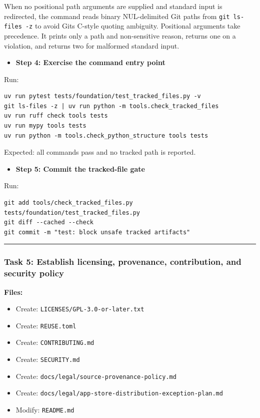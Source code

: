 \documentclass[
  letterpaper,
]{article}
\newcommand{\passthrough}[1]{#1}
\providecommand{\tightlist}{%
  \setlength{\itemsep}{0pt}\setlength{\parskip}{0pt}}
\begin{document}
When no positional path arguments are supplied and standard input is redirected, the command reads binary NUL-delimited
Git paths from \passthrough{\lstinline!git ls-files -z!} to avoid Git\textquotesingle s C-style quoting ambiguity.
Positional arguments take precedence. It prints only a path and non-sensitive reason, returns one on a violation, and
returns two for malformed standard input.

\begin{itemize}
\tightlist
\item[$\boxtimes$]
  \textbf{Step 4: Exercise the command entry point}
\end{itemize}

Run:

\begin{lstlisting}
uv run pytest tests/foundation/test_tracked_files.py -v
git ls-files -z | uv run python -m tools.check_tracked_files
uv run ruff check tools tests
uv run mypy tools tests
uv run python -m tools.check_python_structure tools tests
\end{lstlisting}

Expected: all commands pass and no tracked path is reported.

\begin{itemize}
\tightlist
\item[$\boxtimes$]
  \textbf{Step 5: Commit the tracked-file gate}
\end{itemize}

Run:

\begin{lstlisting}
git add tools/check_tracked_files.py tests/foundation/test_tracked_files.py
git diff --cached --check
git commit -m "test: block unsafe tracked artifacts"
\end{lstlisting}

\begin{center}\rule{0.5\linewidth}{0.5pt}\end{center}

\subsubsection{Task 5: Establish licensing, provenance, contribution, and security
policy}\label{task-5-establish-licensing-provenance-contribution-and-security-policy}

\textbf{Files:}

\begin{itemize}
\tightlist
\item
  Create: \nolinkurl{LICENSES/GPL-3.0-or-later.txt}
\item
  Create: \nolinkurl{REUSE.toml}
\item
  Create: \nolinkurl{CONTRIBUTING.md}
\item
  Create: \nolinkurl{SECURITY.md}
\item
  Create: \nolinkurl{docs/legal/source-provenance-policy.md}
\item
  Create: \nolinkurl{docs/legal/app-store-distribution-exception-plan.md}
\item
  Modify: \passthrough{\lstinline!README.md!}
\end{itemize}
\end{document}
